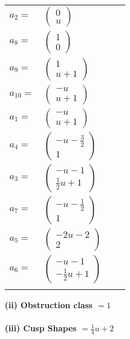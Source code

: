 \documentclass[1p]{elsarticle_modified}
\theoremstyle{definition}
\begin{document}
\begin{tabular}{m{7pt} m{180pt} m{7pt} m{180pt} }
\flushright $a_{2}=$&$\begin{pmatrix}0\\u\end{pmatrix}$ \\
\flushright $a_{8}=$&$\begin{pmatrix}1\\0\end{pmatrix}$ \\
\flushright $a_{9}=$&$\begin{pmatrix}1\\u+1\end{pmatrix}$ \\
\flushright $a_{10}=$&$\begin{pmatrix}- u\\u+1\end{pmatrix}$ \\
\flushright $a_{1}=$&$\begin{pmatrix}- u\\u+1\end{pmatrix}$ \\
\flushright $a_{4}=$&$\begin{pmatrix}- u-\frac{3}{2}\\1\end{pmatrix}$ \\
\flushright $a_{3}=$&$\begin{pmatrix}- u-1\\\frac{1}{2} u+1\end{pmatrix}$ \\
\flushright $a_{7}=$&$\begin{pmatrix}- u-\frac{1}{2}\\1\end{pmatrix}$ \\
\flushright $a_{5}=$&$\begin{pmatrix}-2 u-2\\2\end{pmatrix}$ \\
\flushright $a_{6}=$&$\begin{pmatrix}- u-1\\-\frac{1}{2} u+1\end{pmatrix}$\\&\end{tabular}
\flushleft \textbf{(ii) Obstruction class $= 1$}\\~\\
\flushleft \textbf{(iii) Cusp Shapes $= \frac{1}{4} u+2$}\\~\\
\end{document}
